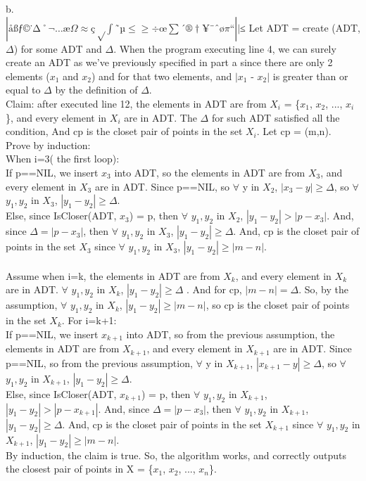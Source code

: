 \documentclass[a4paper]{article}
\begin{document}
b.\\$|åßƒ©˙∆˚¬…æΩ≈ç√∫˜µ≤≥÷œ∑´®†¥¨ˆøπ“ ||$≤
Let ADT = create (ADT, $\Delta$) for some ADT and $\Delta$.
When the program executing line 4, we can surely create an ADT as we've previously specified in part a since there are only 2 elements ($x_1$ and $x_2$) and for that two elements, and $| x_1$ - $x_2 |$ is greater than or equal to $\Delta$ by the definition of $\Delta$.\\
Claim: after executed line 12, the elements in ADT are from $X_i$ = \{$x_1$, $x_2$, ..., $x_i$\}, and every element in $X_i$ are in ADT. The $\Delta$ for such ADT satisfied all the condition, And cp is the closet pair of points in the set $X_i$. Let cp = (m,n).
\\Prove by induction:
\\When i=3( the first loop):\\     
If p==NIL, we insert $x_3$ into ADT, so the elements in ADT are from $X_3$, and every element in $X_3$ are in ADT. Since p==NIL, so $\forall$ y in $X_2$, $| x_3 - y | \geq \Delta$, so $\forall$ $y_1, y_2$ in $X_3$, $| y_1 - y_2 | \geq \Delta$. \\
Else, since IsCloser(ADT, $x_3$) = p, then $\forall$ $y_1, y_2$ in $X_2$, $| y_1 - y_2 | > |p- x_3|$. And, since $\Delta = |p- x_3|$, then $\forall$ $y_1, y_2$ in $X_3$, $| y_1 - y_2 | \geq \Delta$. And, cp is the closet pair of points in the set $X_3$ since $\forall$ $y_1, y_2$ in $X_3$, $| y_1 - y_2 | \geq |m-n|$.\\
\\Assume when i=k, the elements in ADT are from $X_k$, and every element in $X_k$ are in ADT. $\forall$ $y_1, y_2$ in $X_k$, $| y_1 - y_2 | \geq \Delta$ . And for cp, $|m-n| = \Delta$. So, by the assumption, $\forall$ $y_1, y_2$ in $X_k$, $| y_1 - y_2 | \geq |m-n|$, so cp is the closet pair of points in the set $X_k$.
For i=k+1:\\
If p==NIL, we insert $x_{k+1}$ into ADT, so from the previous assumption, the elements in ADT are from $X_{k+1}$, and every element in $X_{k+1}$ are in ADT. Since p==NIL, so from the previous assumption, $\forall$ y in $X_{k+1}$, $| x_{k+1} - y | \geq \Delta$, so $\forall$ $y_1, y_2$ in $X_{k+1}$, $| y_1 - y_2 | \geq \Delta$. \\
Else, since IsCloser(ADT, $x_{k+1}$) = p, then $\forall$ $y_1, y_2$ in $X_{k+1}$, $| y_1 - y_2 | > |p- x_{k+1}|$. And, since $\Delta = |p- x_3|$, then $\forall$ $y_1, y_2$ in $X_{k+1}$, $| y_1 - y_2 | \geq \Delta$. And, cp is the closet pair of points in the set $X_{k+1}$ since $\forall$ $y_1, y_2$ in $X_{k+1}$, $| y_1 - y_2 | \geq |m-n|$.
\\By induction, the claim is true. So, the algorithm works, and correctly outputs the closest pair of points in X = \{$x_1$, $x_2$, ..., $x_n$\}.\\
\end{document}
